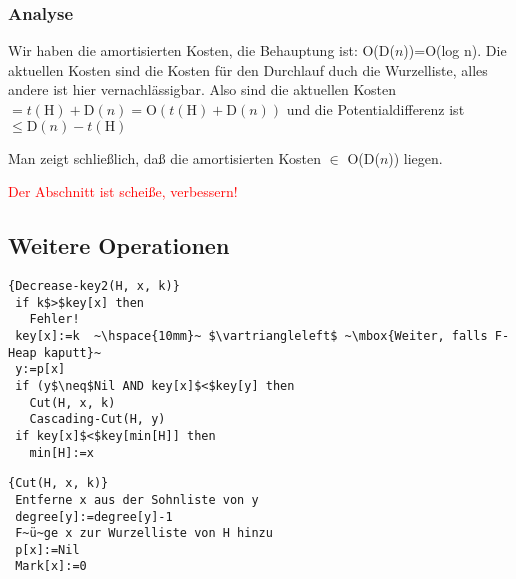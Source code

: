 \subsubsection{Analyse}
Wir haben die amortisierten Kosten, die Behauptung ist: O(D($n$))=O(log n). Die aktuel\-len Kosten sind die Kosten für den
Durchlauf duch die Wurzelliste, alles andere ist hier vernachlässigbar. Also sind die aktuellen Kosten
$=t(\mbox{H})+\mbox{D}(n)=\mbox{O}(t(\mbox{H})+\mbox{D}(n))$ und die Potentialdifferenz ist $\leq
\mbox{D}(n)-t(\mbox{H})$

Man zeigt schließlich, daß die amortisierten Kosten $\in$ O(D($n$)) liegen.

\textcolor{red}{Der Abschnitt ist scheiße, verbessern!}

\subsection{Weitere Operationen}
\begin{Algorithmus}[H]
\begin{lstlisting}[frame=tlrb, mathescape=true, title=\textsc{Decrease-Key\textnormal{(H, x, k)}}, gobble=1]{Decrease-key2(H, x, k)}
 if k$>$key[x] then
   Fehler!
 key[x]:=k  ~\hspace{10mm}~ $\vartriangleleft$ ~\mbox{Weiter, falls F-Heap kaputt}~ 
 y:=p[x]
 if (y$\neq$Nil AND key[x]$<$key[y] then
   Cut(H, x, k)
   Cascading-Cut(H, y)
 if key[x]$<$key[min[H]] then
   min[H]:=x  
\end{lstlisting}
\end{Algorithmus}

\begin{Algorithmus}[H]
\begin{lstlisting}[frame=tlrb, mathescape=true, title=\textsc{Cut\textnormal{(H, x, k)}}, gobble=1]{Cut(H, x, k)}
 Entferne x aus der Sohnliste von y
 degree[y]:=degree[y]-1
 F~ü~ge x zur Wurzelliste von H hinzu
 p[x]:=Nil
 Mark[x]:=0 
\end{lstlisting}
\end{Algorithmus}

